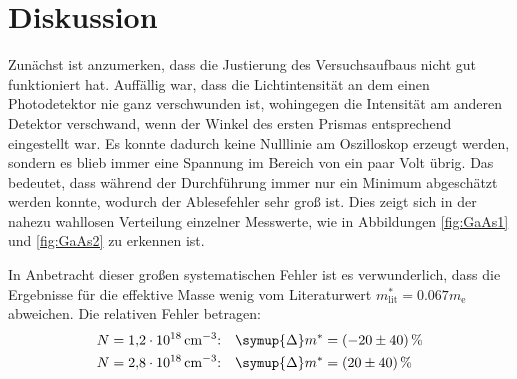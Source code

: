 \section{Diskussion}
Zunächst ist anzumerken, dass die Justierung des Versuchsaufbaus nicht gut funktioniert hat. Auffällig war, dass die Lichtintensität
an dem einen Photodetektor nie ganz verschwunden ist, wohingegen die Intensität am anderen Detektor verschwand, wenn der Winkel des
ersten Prismas entsprechend eingestellt war. Es konnte  dadurch keine Nulllinie am Oszilloskop erzeugt
werden, sondern es blieb immer eine Spannung im Bereich von ein paar Volt übrig. Das bedeutet, dass während der Durchführung immer nur ein
Minimum abgeschätzt werden konnte, wodurch der Ablesefehler sehr groß ist. Dies zeigt sich in der nahezu wahllosen Verteilung einzelner
Messwerte, wie in Abbildungen \ref{fig:GaAs1} und \ref{fig:GaAs2} zu erkennen ist.

In Anbetracht dieser großen systematischen Fehler ist es verwunderlich, dass die Ergebnisse für die effektive Masse wenig vom
Literaturwert $m^*_\text{lit} = \num{0.067}m_\text{e}$ \cite{meff} abweichen. Die relativen Fehler betragen:
\begin{align*}
  N = \SI{1.2e18}{cm^{-3}} &\text{:}\quad \symup{\Delta}m^*= \SI{-20\pm40}{\percent} \\
  N = \SI{2.8e18}{cm^{-3}} &\text{:}\quad \symup{\Delta}m^*= \SI{20\pm40}{\percent}
\end{align*}
